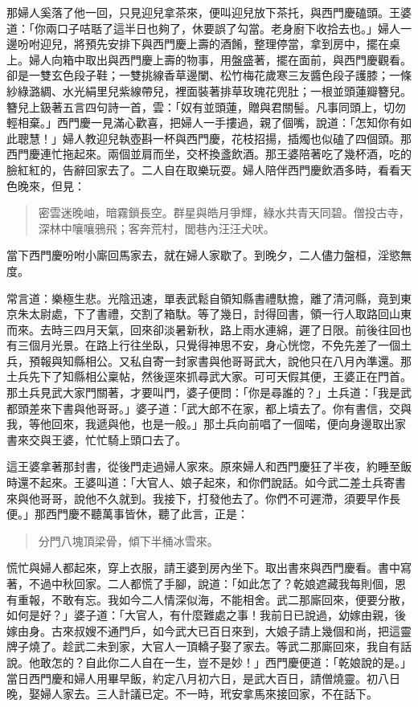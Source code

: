 那婦人奚落了他一回，只見迎兒拿茶來，便叫迎兒放下茶托，與西門慶磕頭。王婆道：「你兩口子咭聒了這半日也夠了，休要誤了勾當。老身廚下收拾去也。」婦人一邊吩咐迎兒，將預先安排下與西門慶上壽的酒餚，整理停當，拿到房中，擺在桌上。婦人向箱中取出與西門慶上壽的物事，用盤盛著，擺在面前，與西門慶觀看。卻是一雙玄色段子鞋；一雙挑線香草邊闌、松竹梅花歲寒三友醬色段子護膝；一條紗綠潞綢、水光絹里兒紫線帶兒，裡面裝著排草玫瑰花兜肚；一根並頭蓮瓣簪兒。簪兒上鈒著五言四句詩一首，雲：「奴有並頭蓮，贈與君關髻。凡事同頭上，切勿輕相棄。」西門慶一見滿心歡喜，把婦人一手摟過，親了個嘴，說道：「怎知你有如此聰慧！」婦人教迎兒執壺斟一杯與西門慶，花枝招揚，插燭也似磕了四個頭。那西門慶連忙拖起來。兩個並肩而坐，交杯換盞飲酒。那王婆陪著吃了幾杯酒，吃的臉紅紅的，告辭回家去了。二人自在取樂玩耍。婦人陪伴西門慶飲酒多時，看看天色晚來，但見：
\begin{quote}
密雲迷晚岫，暗霧鎖長空。群星與皓月爭輝，綠水共青天同碧。僧投古寺，深林中嚷嚷鴉飛；客奔荒村，閭巷內汪汪犬吠。
\end{quote}

當下西門慶吩咐小廝回馬家去，就在婦人家歇了。到晚夕，二人儘力盤桓，淫慾無度。

常言道：樂極生悲。光陰迅速，單表武鬆自領知縣書禮馱擔，離了清河縣，竟到東京朱太尉處，下了書禮，交割了箱馱。等了幾日，討得回書，領一行人取路回山東而來。去時三四月天氣，回來卻淡暑新秋，路上雨水連綿，遲了日限。前後往回也有三個月光景。在路上行往坐臥，只覺得神思不安，身心恍惚，不免先差了一個土兵，預報與知縣相公。又私自寄一封家書與他哥哥武大，說他只在八月內準還。那土兵先下了知縣相公稟帖，然後逕來抓尋武大家。可可天假其便，王婆正在門首。那土兵見武大家門關著，才要叫門，婆子便問：「你是尋誰的？」土兵道：「我是武都頭差來下書與他哥哥。」婆子道：「武大郎不在家，都上墳去了。你有書信，交與我，等他回來，我遞與他，也是一般。」那土兵向前唱了一個喏，便向身邊取出家書來交與王婆，忙忙騎上頭口去了。

這王婆拿著那封書，從後門走過婦人家來。原來婦人和西門慶狂了半夜，約睡至飯時還不起來。王婆叫道：「大官人、娘子起來，和你們說話。如今武二差土兵寄書來與他哥哥，說他不久就到。我接下，打發他去了。你們不可遲滯，須要早作長便。」那西門慶不聽萬事皆休，聽了此言，正是：
\begin{quote}
分門八塊頂梁骨，傾下半桶冰雪來。
\end{quote}
慌忙與婦人都起來，穿上衣服，請王婆到房內坐下。取出書來與西門慶看。書中寫著，不過中秋回家。二人都慌了手腳，說道：「如此怎了？乾娘遮藏我每則個，恩有重報，不敢有忘。我如今二人情深似海，不能相舍。武二那廝回來，便要分散，如何是好？」婆子道：「大官人，有什麼難處之事！我前日已說過，幼嫁由親，後嫁由身。古來叔嫂不通門戶，如今武大已百日來到，大娘子請上幾個和尚，把這靈牌子燒了。趁武二未到家，大官人一頂轎子娶了家去。等武二那廝回來，我自有話說。他敢怎的？自此你二人自在一生，豈不是妙！」西門慶便道：「乾娘說的是。」當日西門慶和婦人用畢早飯，約定八月初六日，是武大百日，請僧燒靈。初八日晚，娶婦人家去。三人計議已定。不一時，玳安拿馬來接回家，不在話下。

